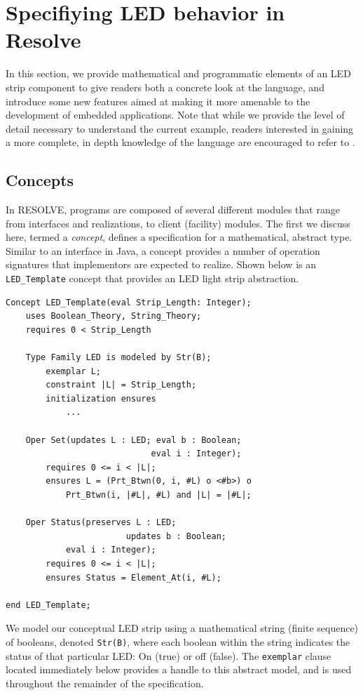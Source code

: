 \section{Specifiying LED behavior in Resolve}
\label{sec:specifiying}

In this section, we provide mathematical and programmatic elements of an LED strip component to give readers both a concrete look at the language, and introduce some new features aimed at making it more amenable to the development of embedded applications. Note that while we provide the level of detail necessary to understand the current example, readers interested in gaining a more complete, in depth knowledge of the language are encouraged to refer to \cite{sitaraman:2011, kulczycki:2008}.

\subsection{Concepts}
\label{ssec:concepts}
In RESOLVE, programs are composed of several different modules that range from interfaces and realizations, to client (facility) modules. The first we  discuss here, termed a \textit{concept}, defines a specification for a mathematical, abstract type. Similar to an interface in Java, a concept provides a number of operation signatures that implementors are expected to realize. Shown below is an \texttt{LED\_Template} concept that provides an LED light strip abstraction.

\begin{verbatim}
Concept LED_Template(eval Strip_Length: Integer);
    uses Boolean_Theory, String_Theory;
    requires 0 < Strip_Length 
	
    Type Family LED is modeled by Str(B);
        exemplar L;
        constraint |L| = Strip_Length;
        initialization ensures 
            ...
    
    Oper Set(updates L : LED; eval b : Boolean; 
                             eval i : Integer);
        requires 0 <= i < |L|;
        ensures L = (Prt_Btwn(0, i, #L) o <#b>) o
            Prt_Btwn(i, |#L|, #L) and |L| = |#L|;
    
    Oper Status(preserves L : LED; 
                        updates b : Boolean;
            eval i : Integer);
        requires 0 <= i < |L|;
        ensures Status = Element_At(i, #L);
        
end LED_Template;
\end{verbatim}

We model our conceptual LED strip using a mathematical string (finite sequence) of booleans, denoted \texttt{Str(B)}, where each boolean within the string indicates the status of that particular LED: On (true) or off (false). The \texttt{exemplar} clause located immediately below provides a handle to this abstract model, and is used throughout the remainder of the specification.

